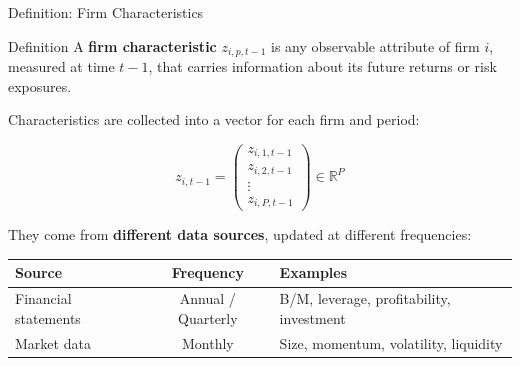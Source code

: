 \documentclass[aspectratio=169]{beamer}
\begin{document}
\begin{frame}{Definition: Firm Characteristics}

\begin{block}{Definition}
A \textbf{firm characteristic} $z_{i,p,t-1}$ is any observable attribute of firm $i$,
measured at time $t-1$, that carries information about its future returns or risk
exposures.
\end{block}

\bigskip
Characteristics are collected into a vector for each firm and period:

$$z_{i,t-1} = \begin{pmatrix} z_{i,1,t-1} \\ z_{i,2,t-1} \\ \vdots \\ z_{i,P,t-1} \end{pmatrix} \in \mathbb{R}^P$$

\medskip
They come from \textbf{different data sources}, updated at different frequencies:

\begin{center}
\begin{tabular}{lcl}
\toprule
\textbf{Source} & \textbf{Frequency} & \textbf{Examples} \\
\midrule
Financial statements & Annual / Quarterly & B/M, leverage, profitability, investment \\
Market data         & Monthly            & Size, momentum, volatility, liquidity \\
\bottomrule
\end{tabular}
\end{center}


\end{frame}
%
%
\end{document}
